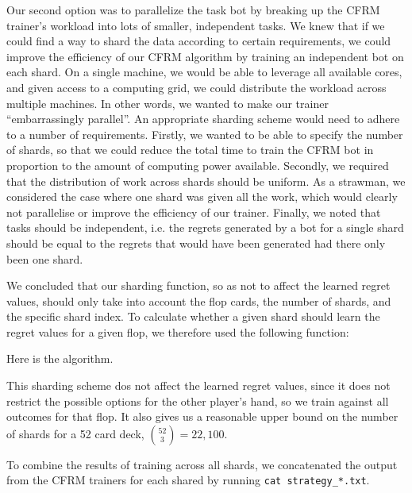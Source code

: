 \documentclass[11pt]{article}
\begin{document}
Our second option was to parallelize the task bot by breaking up the CFRM trainer’s workload into lots of smaller, independent tasks. We knew that if we could find a way to shard the data according to certain requirements, we could improve the efficiency of our CFRM algorithm by training an independent bot on each shard. On a single machine, we would be able to leverage all available cores, and given access to a computing grid, we could distribute the workload across multiple machines. In other words, we wanted to make our trainer ``embarrassingly parallel''. An appropriate sharding scheme would need to adhere to a number of requirements. Firstly, we wanted to be able to specify the number of shards, so that we could reduce the total time to train the CFRM bot in proportion to the amount of computing power available. Secondly, we required that the distribution of work across shards should be uniform. As a strawman, we considered the case where one shard was given all the work, which would clearly not parallelise or improve the efficiency of our trainer. Finally, we noted that tasks should be independent, i.e. the regrets generated by a bot for a single shard should be equal to the regrets that would have been generated had there only been one shard.

We concluded that our sharding function, so as not to affect the learned regret values, should only take into account the flop cards, the number of shards, and the specific shard index. To calculate whether a given shard should learn the regret values for a given flop, we therefore used the following function:

\begin{algorithm}
  \begin{algorithmic}
    \EndProcedure{}
  \end{algorithmic}
  \caption{Here is the algorithm.}
\end{algorithm}

This sharding scheme dos not affect the learned regret values, since it does not restrict the possible options for the other player’s hand, so we train against all outcomes for that flop. It also gives us a reasonable upper bound on the number of shards for a 52 card deck, $\binom{52}{3} = 22,100$.

To combine the results of training across all shards, we concatenated the output from the CFRM trainers for each shared by running \verb+cat strategy_*.txt+.
\end{document}
